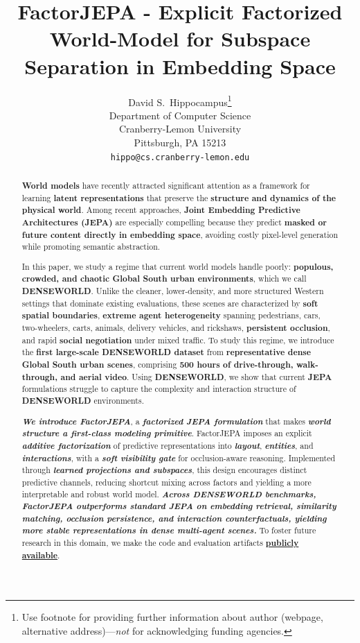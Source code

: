\documentclass{article}
\title{FactorJEPA - Explicit
Factorized World-Model for Subspace Separation in Embedding Space}
\author{%
  David S.~Hippocampus\thanks{Use footnote for providing further information
    about author (webpage, alternative address)---\emph{not} for acknowledging
    funding agencies.} \\
  Department of Computer Science\\
  Cranberry-Lemon University\\
  Pittsburgh, PA 15213 \\
  \texttt{hippo@cs.cranberry-lemon.edu} \\
}
\begin{document}
\maketitle


\begin{abstract}
\textbf{World models} have recently attracted significant attention as a framework for learning \textbf{latent representations} that preserve the \textbf{structure and dynamics of the physical world}. Among recent approaches, \textbf{Joint Embedding Predictive Architectures (JEPA)} are especially compelling because they predict \textbf{masked or future content directly in embedding space}, avoiding costly pixel-level generation while promoting semantic abstraction.

In this paper, we study a regime that current world models handle poorly: \textbf{populous, crowded, and chaotic Global South urban environments}, which we call \textbf{DENSEWORLD}. Unlike the cleaner, lower-density, and more structured Western settings that dominate existing evaluations, these scenes are characterized by \textbf{soft spatial boundaries}, \textbf{extreme agent heterogeneity} spanning pedestrians, cars, two-wheelers, carts, animals, delivery vehicles, and rickshaws, \textbf{persistent occlusion}, and rapid \textbf{social negotiation} under mixed traffic. To study this regime, we introduce the \textbf{first large-scale DENSEWORLD dataset} from \textbf{representative dense Global South urban scenes}, comprising \textbf{500 hours of drive-through, walk-through, and aerial video}. Using \textbf{DENSEWORLD}, we show that current \textbf{JEPA} formulations struggle to capture the complexity and interaction structure of \textbf{DENSEWORLD} environments.

\textbf{\emph{We introduce FactorJEPA}}, a \textbf{\emph{factorized JEPA formulation}} that makes \textbf{\emph{world structure a first-class modeling primitive}}. FactorJEPA imposes an explicit \textbf{\emph{additive factorization}} of predictive representations into \textbf{\emph{layout}}, \textbf{\emph{entities}}, and \textbf{\emph{interactions}}, with a \textbf{\emph{soft visibility gate}} for occlusion-aware reasoning. Implemented through \textbf{\emph{learned projections and subspaces}}, this design encourages distinct predictive channels, reducing shortcut mixing across factors and yielding a more interpretable and robust world model. \textbf{\emph{Across DENSEWORLD benchmarks, FactorJEPA outperforms standard JEPA on embedding retrieval, similarity matching, occlusion persistence, and interaction counterfactuals, yielding more stable representations in dense multi-agent scenes.}} To foster future research in this domain, we make the code and evaluation artifacts \href{https://anonymous.4open.science/r/NEPHOS-72D4/README.md}{\textbf{publicly available}}.
\end{abstract}
\end{document}
